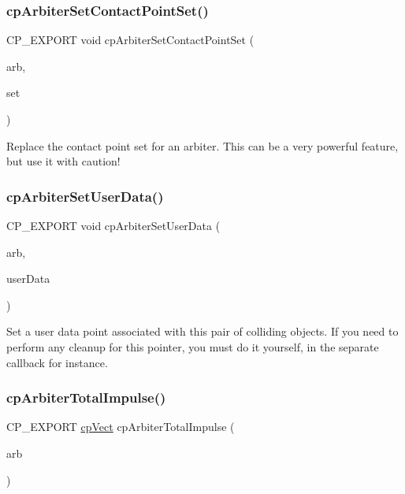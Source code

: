 \subsubsection{\texorpdfstring{cp\+Arbiter\+Set\+Contact\+Point\+Set()}{cpArbiterSetContactPointSet()}}
{\footnotesize\ttfamily C\+P\+\_\+\+E\+X\+P\+O\+RT void cp\+Arbiter\+Set\+Contact\+Point\+Set (\begin{DoxyParamCaption}\item[{\mbox{\hyperlink{structcp_arbiter}{cp\+Arbiter}} $\ast$}]{arb,  }\item[{\mbox{\hyperlink{structcp_contact_point_set}{cp\+Contact\+Point\+Set}} $\ast$}]{set }\end{DoxyParamCaption})}

Replace the contact point set for an arbiter. This can be a very powerful feature, but use it with caution! \mbox{\label{group__cp_arbiter_gafb92e7ea05fb11021ce3f01ff4baa067}} 
\subsubsection{\texorpdfstring{cp\+Arbiter\+Set\+User\+Data()}{cpArbiterSetUserData()}}
{\footnotesize\ttfamily C\+P\+\_\+\+E\+X\+P\+O\+RT void cp\+Arbiter\+Set\+User\+Data (\begin{DoxyParamCaption}\item[{\mbox{\hyperlink{structcp_arbiter}{cp\+Arbiter}} $\ast$}]{arb,  }\item[{\mbox{\hyperlink{group__basic_types_ga2ac2c3c31e21893941f9e4f8ee279447}{cp\+Data\+Pointer}}}]{user\+Data }\end{DoxyParamCaption})}

Set a user data point associated with this pair of colliding objects. If you need to perform any cleanup for this pointer, you must do it yourself, in the separate callback for instance. \mbox{\label{group__cp_arbiter_ga7dcf707be34b3ecddba4d61ff9d11415}} 
\subsubsection{\texorpdfstring{cp\+Arbiter\+Total\+Impulse()}{cpArbiterTotalImpulse()}}
{\footnotesize\ttfamily C\+P\+\_\+\+E\+X\+P\+O\+RT \mbox{\hyperlink{structcp_vect}{cp\+Vect}} cp\+Arbiter\+Total\+Impulse (\begin{DoxyParamCaption}\item[{const \mbox{\hyperlink{structcp_arbiter}{cp\+Arbiter}} $\ast$}]{arb }\end{DoxyParamCaption})}

